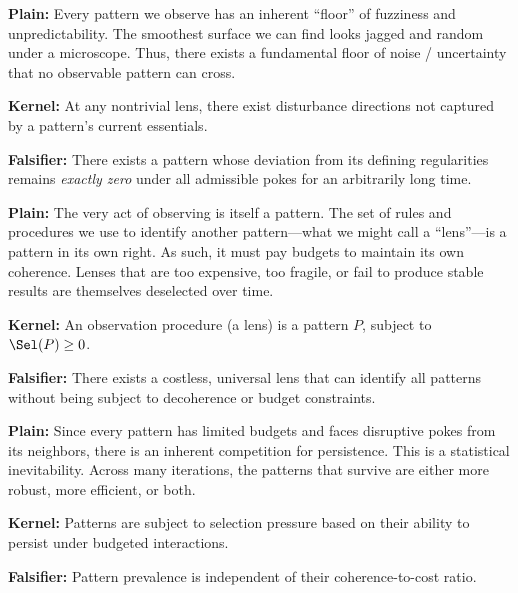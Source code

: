 \begin{description}[leftmargin=2.2cm,style=nextline]
\item[\textbf{P7 (No pattern is perfect).}]
\label{prior:P7}\label{prior:irreducible-openness}\label{prior:A9}

\textbf{Plain:} Every pattern we observe has an inherent ``floor'' of fuzziness and unpredictability. The smoothest surface we can find looks jagged and random under a microscope. Thus, there exists a fundamental floor of noise / uncertainty that no observable pattern can cross.

\textbf{Kernel:} At any nontrivial lens, there exist disturbance directions not captured by a pattern's current essentials.

\textbf{Falsifier:} There exists a pattern whose deviation from its defining regularities remains \emph{exactly zero} under all admissible pokes for an arbitrarily long time.

\item[\textbf{P8 (Observation is a pattern).}]
\label{prior:P8}\label{prior:observation-is-pattern}\label{prior:A10}

\textbf{Plain:} The very act of observing is itself a pattern. The set of rules and procedures we use to identify another pattern---what we might call a ``lens''---is a pattern in its own right. As such, it must pay budgets to maintain its own coherence. Lenses that are too expensive, too fragile, or fail to produce stable results are themselves deselected over time.

\textbf{Kernel:} An observation procedure (a lens) is a pattern $P$, subject to $\Sel(P) \ge 0$.

\textbf{Falsifier:} There exists a costless, universal lens that can identify all patterns without being subject to decoherence or budget constraints.

\item[\textbf{P9 (Patterns compete for existence).}]
\label{prior:P9}\label{prior:competition}\label{prior:A5}

\textbf{Plain:} Since every pattern has limited budgets and faces disruptive pokes from its neighbors, there is an inherent competition for persistence. This is a statistical inevitability. Across many iterations, the patterns that survive are either more robust, more efficient, or both.

\textbf{Kernel:} Patterns are subject to selection pressure based on their ability to persist under budgeted interactions.

\textbf{Falsifier:} Pattern prevalence is independent of their coherence-to-cost ratio.


\end{description}
